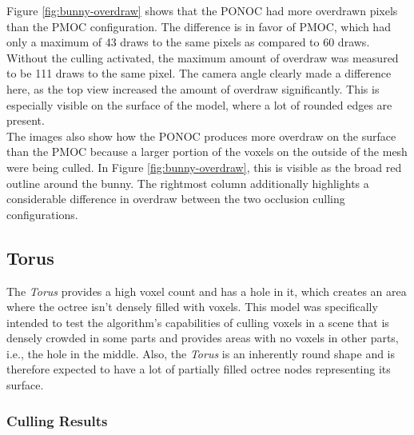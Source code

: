 \noindent
Figure \ref{fig:bunny-overdraw} shows that the \ac{PONOC} had more overdrawn pixels than the 
\ac{PMOC} configuration. The difference is in favor of \ac{PMOC}, which had only a maximum of 
43 draws to the same pixels as compared to 60 draws. \\ 

\noindent
Without the culling activated, the maximum amount of overdraw was measured to be 111 draws to 
the same pixel. The camera angle clearly made a difference here, as the top view increased the 
amount of overdraw significantly. This is especially visible on the surface of the model, 
where a lot of rounded edges are present. \\

\noindent
The images also show how the \ac{PONOC} produces more overdraw on the surface than the \ac{PMOC} 
because a larger portion of the voxels on the outside of the mesh were being culled. In Figure 
\ref{fig:bunny-overdraw}, this is visible as the broad red outline around the bunny. The rightmost 
column additionally highlights a considerable difference in overdraw between the two occlusion 
culling configurations.

\clearpage



\subsection*{Torus}

The \emph{Torus} provides a high voxel count and has a hole in it, which creates an area where the 
octree isn't densely filled with voxels. This model was specifically intended to test the algorithm's 
capabilities of culling voxels in a scene that is densely crowded in some parts and provides areas with 
no voxels in other parts, i.e., the hole in the middle. Also, the \emph{Torus} is an inherently round 
shape and is therefore expected to have a lot of partially filled octree nodes representing its surface. 

\subsubsection*{Culling Results} \label{subsubsec-culling-results-torus}


